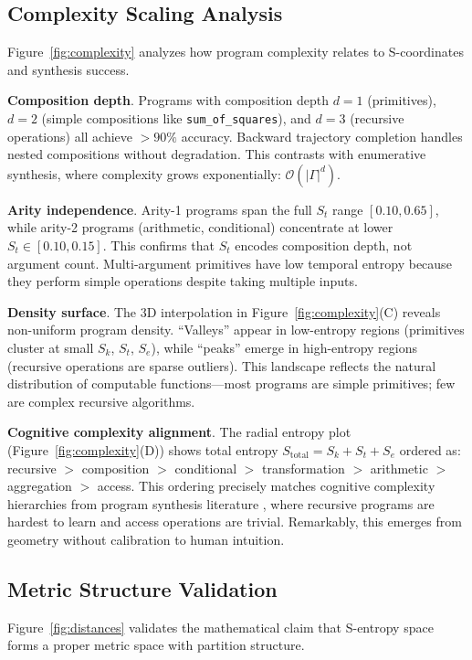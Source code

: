 \documentclass[twocolumn,10pt]{article}
\begin{document}
\subsection{Complexity Scaling Analysis}

Figure~\ref{fig:complexity} analyzes how program complexity relates to S-coordinates and synthesis success.

\textbf{Composition depth}. Programs with composition depth $d=1$ (primitives), $d=2$ (simple compositions like \texttt{sum\_of\_squares}), and $d=3$ (recursive operations) all achieve $>90\%$ accuracy. Backward trajectory completion handles nested compositions without degradation. This contrasts with enumerative synthesis, where complexity grows exponentially: $\mathcal{O}(|\Gamma|^d)$.

\textbf{Arity independence}. Arity-1 programs span the full $S_t$ range $[0.10, 0.65]$, while arity-2 programs (arithmetic, conditional) concentrate at lower $S_t \in [0.10, 0.15]$. This confirms that $S_t$ encodes composition depth, not argument count. Multi-argument primitives have low temporal entropy because they perform simple operations despite taking multiple inputs.

\textbf{Density surface}. The 3D interpolation in Figure~\ref{fig:complexity}(C) reveals non-uniform program density. ``Valleys'' appear in low-entropy regions (primitives cluster at small $S_k$, $S_t$, $S_e$), while ``peaks'' emerge in high-entropy regions (recursive operations are sparse outliers). This landscape reflects the natural distribution of computable functions—most programs are simple primitives; few are complex recursive algorithms.

\textbf{Cognitive complexity alignment}. The radial entropy plot (Figure~\ref{fig:complexity}(D)) shows total entropy $S_{\text{total}} = S_k + S_t + S_e$ ordered as: recursive $>$ composition $>$ conditional $>$ transformation $>$ arithmetic $>$ aggregation $>$ access. This ordering precisely matches cognitive complexity hierarchies from program synthesis literature \cite{Gulwani2017}, where recursive programs are hardest to learn and access operations are trivial. Remarkably, this emerges from geometry without calibration to human intuition.

\subsection{Metric Structure Validation}

Figure~\ref{fig:distances} validates the mathematical claim that S-entropy space forms a proper metric space with partition structure.
\end{document}
